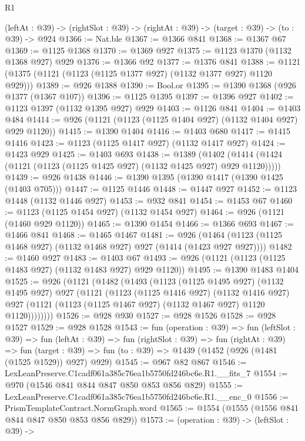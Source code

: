 \begin{lexlean}{R1}
\begin{coremodule}
  (leftAt : @39) -> (rightSlot : @39) -> (rightAt : @39) -> (target : @39) -> (to : @39) -> @924
@1366 := Nat.ble
@1367 := @1366 @841
@1368 := @1367 @67
@1369 := @1125 @1368
@1370 := @1369 @927
@1375 := @1123 @1370 (@1132 @1368 @927) @929
@1376 := @1366 @92
@1377 := @1376 @841
@1388 := @1121 (@1375 (@1121 (@1123 (@1125 @1377 @927) (@1132 @1377 @927) @1120 @929)))
@1389 := @926 @1388
@1390 := Bool.or
@1395 := @1390 @1368 (@926 @1377 (@1367 @107))
@1396 := @1125 @1395
@1397 := @1396 @927
@1402 := @1123 @1397 (@1132 @1395 @927) @929
@1403 := @1126 @841
@1404 := @1403 @484
@1414 := @926 (@1121 (@1123 (@1125 @1404 @927) (@1132 @1404 @927) @929 @1120))
@1415 := @1390 @1404
@1416 := @1403 @680
@1417 := @1415 @1416
@1423 := @1123 (@1125 @1417 @927) (@1132 @1417 @927)
@1424 := @1423 @929
@1425 := @1403 @693
@1438 := @1389
    (@1402 (@1414 (@1424 (@1121 (@1123 (@1125 @1425 @927) (@1132 @1425 @927) @929 @1120)))))
@1439 := @926 @1438
@1446 := @1390 @1395 (@1390 @1417 (@1390 @1425 (@1403 @705)))
@1447 := @1125 @1446
@1448 := @1447 @927
@1452 := @1123 @1448 (@1132 @1446 @927)
@1453 := @932 @841
@1454 := @1453 @67
@1460 := @1123 (@1125 @1454 @927) (@1132 @1454 @927)
@1464 := @926 (@1121 (@1460 @929 @1120))
@1465 := @1390 @1454
@1466 := @1366 @693
@1467 := @1466 @841
@1468 := @1465 @1467
@1481 := @926 (@1464 (@1123 (@1125 @1468 @927) (@1132 @1468 @927) @927 (@1414 (@1423 @927 @927))))
@1482 := @1460 @927
@1483 := @1403 @67
@1493 := @926 (@1121 (@1123 (@1125 @1483 @927) (@1132 @1483 @927) @929 @1120))
@1495 := @1390 @1483 @1404
@1525 := @926
    (@1121
      (@1482
        (@1493
          (@1123
            (@1125 @1495 @927)
            (@1132 @1495 @927)
            @927
            (@1121
              (@1123
                (@1125 @1416 @927)
                (@1132 @1416 @927)
                @927
                (@1121 (@1123 (@1125 @1467 @927) (@1132 @1467 @927) @1120 @1120))))))))
@1526 := @928 @930
@1527 := @928 @1526
@1528 := @928 @1527
@1529 := @928 @1528
@1543 := fun (operation : @39) =>
  fun (leftSlot : @39) =>
  fun (leftAt : @39) =>
  fun (rightSlot : @39) =>
  fun (rightAt : @39) =>
  fun (target : @39) => fun (to : @39) => @1439 (@1452 (@926 (@1481 (@1525 @1529)) @927) @929)
@1545 := @967 @82 @867
@1546 := LexLeanPreserve.C1cadf061a385c76ea1b5750fd246bc6e.R1.__fits_7
@1554 := @970 (@1546 @841 @844 @847 @850 @853 @856 @829)
@1555 := LexLeanPreserve.C1cadf061a385c76ea1b5750fd246bc6e.R1.__enc_0
@1556 := PrismTemplateContract.NormGraph.word
@1565 := @1554 (@1555 (@1556 @841 @844 @847 @850 @853 @856 @829))
@1573 := (operation : @39) ->
  (leftSlot : @39) ->

\end{coremodule}
\end{lexlean}
